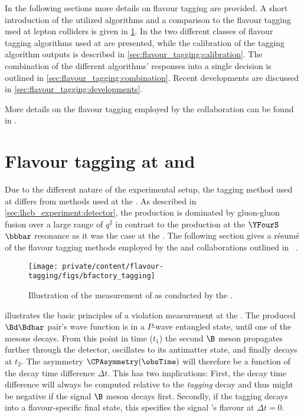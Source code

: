 In the following sections more details on flavour tagging are provided. A short
introduction of the utilized algorithms and a comparison to the flavour tagging
used at lepton colliders is given in \cref{sec:flavour_tagging:b_factories}. In
 the two different classes of flavour tagging
algorithms used at \LHCb are presented, while the calibration of the tagging
algorithm outputs is described in
\cref{sec:flavour_tagging:calibration}. The combination of the different
algorithms' responses into a single decision is outlined in
\cref{sec:flavour_tagging:combination}. Recent developments are discussed in
\cref{sec:flavour_tagging:developments}.

More details on the flavour tagging employed by the \LHCb collaboration can be
found in \cite{Aaij:2012mu,FT:RunI}.

\section{Flavour tagging at \Babar and \Belle}
\label{sec:flavour_tagging:b_factories}

Due to the different nature of the experimental setup, the tagging method used
at \LHCb differs from methods used at the \BFactories. As described in
\cref{sec:lhcb_experiment:detector}, the \bhadron production is dominated
by gluon-gluon fusion over a large range of $q^2$ in contrast to the production
at the $\YFourS$ $\bbbar$ resonance as it was the case at the \BFactories. The
following section gives a résumé of the flavour tagging methods employed by the
\Babar and \Belle collaborations outlined in \Ref~\cite[][Ch. 8]{Bevan:2014iga}.
%
\begin{figure}[h]
\centering
\texttt{[image: private/content/flavour-tagging/figs/bfactory\_tagging]}
\caption{Illustration of the measurement of \sintwobeta as conducted by the \BFactories.
}
\label{fig:flavour_tagging:lhcb:b_factory_basic_principles}
\end{figure}

 illustrates the basic
principles of a \CP violation measurement at the \BFactories. The produced
$\Bd\Bdbar$ pair's wave function is in a $P$-wave entangled state, until one of
the mesons decays. From this point in time ($t_1$) the second $\B$ meson
propagates further through the detector, oscillates to its antimatter state, and
finally decays at $t_2$. The \CP asymmetry $\CPAsymmetry(\obsTime)$ will
therefore be a function of the decay time difference $\Delta t$. This has two
implications: First, the decay time difference will always be computed relative
to the \emph{tagging} \Bmeson decay and thus might be negative if the signal
$\B$ meson decays first. Secondly, if the tagging \Bmeson decays into a
flavour-specific final state, this specifies the signal \Bmeson's flavour at
$\Delta t=0$.

